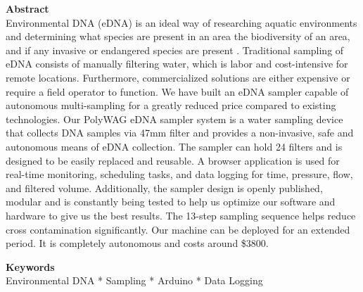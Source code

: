 \documentclass[11pt, letterpaper]{article}
\begin{document}
\begin{flushleft}
%
%
\textbf{Abstract} \\ 
Environmental DNA (eDNA) is an ideal way of researching aquatic environments and determining what species are present in an area the biodiversity of an area, and if any invasive or endangered species are present . Traditional sampling of eDNA consists of manually filtering water,  which is labor and cost-intensive for remote locations. Furthermore, commercialized solutions  are either expensive or require a field operator to function.  We have built an eDNA sampler capable of autonomous multi-sampling for a greatly reduced price compared to existing technologies. Our PolyWAG eDNA sampler system is a water sampling device that collects DNA samples via 47mm filter and provides a non-invasive, safe and autonomous means of eDNA collection. The sampler can hold 24 filters and is designed to be easily replaced and reusable. A browser application is used for real-time monitoring, scheduling tasks, and data logging for time, pressure, flow, and filtered volume. Additionally, the sampler design is openly published, modular and is constantly being tested to help us optimize our software and hardware to give us the best results. The 13-step  sampling sequence helps reduce cross contamination significantly. Our machine can be deployed for an extended period. It is completely autonomous and costs around \$3800.


%
%
\textbf{Keywords} \\
Environmental DNA * Sampling * Arduino * Data Logging \\



\end{flushleft}
\end{document}
